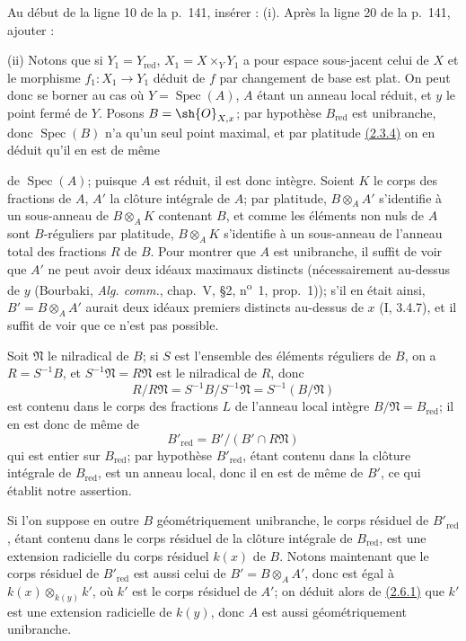Au début de la ligne 10 de la p.~141, insérer : (i). Après la ligne 20
de la p.~141, ajouter :

\smallskip
\noindent
\textup{(ii)} Notons que si $Y_1=Y_{\mathrm{red}}$,
$X_1=X\times_Y Y_1$ a pour espace sous-jacent celui de $X$ et le
morphisme $f_1:X_1\to Y_1$ déduit de $f$ par changement de base est
plat. On peut donc se borner au cas où $Y=\operatorname{Spec}(A)$,
$A$ étant un anneau local réduit, et $y$ le point fermé de $Y$. Posons
$B=\sh{O}_{X,x}$; par hypothèse $B_{\mathrm{red}}$ est unibranche, donc
$\operatorname{Spec}(B)$ n'a qu'un seul point maximal, et par platitude
{\hyperlink{ega4.c04.prop.2-3-4}{(2.3.4)}} on en déduit qu'il en est de
même

de $\operatorname{Spec}(A)$; puisque $A$ est réduit, il est donc
intègre. Soient $K$ le corps des fractions de $A$, $A'$ la clôture
intégrale de $A$; par platitude, $B\otimes_AA'$ s'identifie à un
sous-anneau de $B\otimes_AK$ contenant $B$, et comme les éléments non
nuls de $A$ sont $B$-réguliers par platitude, $B\otimes_AK$ s'identifie
à un sous-anneau de l'anneau total des fractions $R$ de $B$. Pour
montrer que $A$ est unibranche, il suffit de voir que $A'$ ne peut avoir
deux idéaux maximaux distincts (nécessairement au-dessus de $y$
(Bourbaki, \emph{Alg. comm.}, chap.~V, \S2,
n\textsuperscript{o}~1, prop.~1)); s'il en était ainsi,
$B'=B\otimes_AA'$ aurait deux idéaux premiers distincts au-dessus de
$x$ (I, 3.4.7), et il suffit de voir que ce n'est pas possible.

Soit $\mathfrak N$ le nilradical de $B$; si $S$ est l'ensemble des
éléments réguliers de $B$, on a $R=S^{-1}B$, et
$S^{-1}\mathfrak N=R\mathfrak N$ est le nilradical de $R$, donc
\[
 R/R\mathfrak N=S^{-1}B/S^{-1}\mathfrak N=S^{-1}(B/\mathfrak N)
\]
est contenu dans le corps des fractions $L$ de l'anneau local intègre
$B/\mathfrak N=B_{\mathrm{red}}$; il en est donc de même de
\[
 B'_{\mathrm{red}}=B'/(B'\cap R\mathfrak N)
\]
qui est entier sur $B_{\mathrm{red}}$; par hypothèse
$B'_{\mathrm{red}}$, étant contenu dans la clôture intégrale de
$B_{\mathrm{red}}$, est un anneau local, donc il en est de même de
$B'$, ce qui établit notre assertion.

Si l'on suppose en outre $B$ géométriquement unibranche, le corps
résiduel de $B'_{\mathrm{red}}$, étant contenu dans le corps résiduel de
la clôture intégrale de $B_{\mathrm{red}}$, est une extension radicielle
du corps résiduel $k(x)$ de $B$. Notons maintenant que le corps résiduel
de $B'_{\mathrm{red}}$ est aussi celui de $B'=B\otimes_AA'$, donc est
égal à $k(x)\otimes_{k(y)}k'$, où $k'$ est le corps résiduel de $A'$;
on déduit alors de {\hyperlink{ega4.c04.prop.2-6-1}{(2.6.1)}} que $k'$
est une extension radicielle de $k(y)$, donc $A$ est aussi
géométriquement unibranche.

